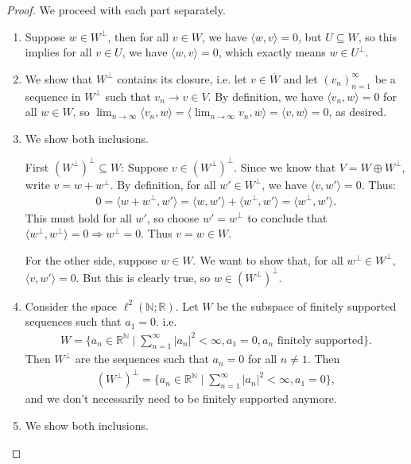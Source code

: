 \documentclass[12pt]{article}
\theoremstyle{remark}
\theoremstyle{named}
\newcommand{\N}{\mathbb N}
\newcommand{\R}{\mathbb R}
\renewcommand{\implies}{\Rightarrow}
\begin{document}
\begin{proof}
    We proceed with each part separately.
    \begin{enumerate}
        \item Suppose \(w \in W^\perp\), then for all \(v \in W\), we have \(\langle w, v \rangle = 0\), but \(U \subseteq W\), so this implies for all \(v \in U\), we have \(\langle w, v \rangle = 0\), which exactly means \(w \in U^\perp\).
        \item We show that \(W^\perp\) contains its closure, i.e. let \(v \in \overline W\) and let \((v_n)_{n = 1}^\infty\) be a sequence in \(W^\perp\) such that \(v_n \to v \in V\). By definition, we have \(\langle v_n, w \rangle = 0\) for all \(w \in W\), so \(\lim_{n \to \infty} \langle v_n, w \rangle = \langle \lim_{n \to \infty} v_n, w \rangle = \langle v, w \rangle = 0\), as desired.
        \item We show both inclusions. 
        
        First \((W^\perp)^\perp \subseteq W\): Suppose \(v \in (W^\perp)^\perp\). Since we know that \(V = W \oplus W^\perp\), write \(v = w + w^\perp\). By definition, for all \(w' \in W^\perp\), we have \(\langle v, w' \rangle = 0\). Thus:
        \begin{align*}
            0 = \langle w + w^\perp, w' \rangle = \langle w, w' \rangle + \langle w^\perp, w' \rangle = \langle w^\perp, w' \rangle.
        \end{align*}
        This must hold for all \(w'\), so choose \(w' = w^\perp\) to conclude that \(\langle w^\perp, w^\perp \rangle = 0 \implies w^\perp = 0\). Thus \(v = w \in W\).

        For the other side, suppose \(w \in W\). We want to show that, for all \(w^\perp \in W^\perp\), \(\langle v, w' \rangle = 0\). But this is clearly true, so \(w \in (W^\perp)^\perp\).
        \item Consider the space \(\ell^2(\N;\R)\). Let \(W\) be the subspace of finitely supported sequences such that \(a_1 = 0\). i.e. 
        \begin{align*}
            W = \{a_n \in \R^{\N} \mid \sum_{n = 1}^{\infty} |a_n|^2 < \infty, a_1 = 0, a_n \text{  finitely supported}\}.
        \end{align*}
        Then \(W^\perp\) are the sequences such that \(a_n = 0\) for all \(n \neq 1\). Then
        \begin{align*}
            (W^\perp)^\perp = \{a_n \in \R^{\N} \mid \sum_{n = 1}^{\infty} |a_n|^2 < \infty, a_1 = 0\},
        \end{align*}
        and we don't necessarily need to be finitely supported anymore.
        \item We show both inclusions.
        

\end{enumerate}
\end{proof}
\end{document}
